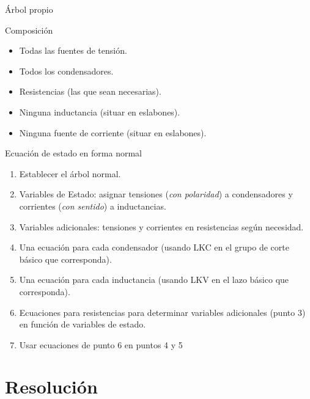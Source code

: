 \documentclass[aspectratio=169, usenames,svgnames,dvipsnames]{beamer}
\begin{document}
\begin{frame}[label={sec:org71f7896}]{Árbol propio}
\begin{block}{Composición}
\begin{itemize}
\item Todas las fuentes de tensión.
\item Todos los condensadores.
\item Resistencias (las que sean necesarias).
\item Ninguna inductancia (situar en eslabones).
\item Ninguna fuente de corriente (situar en eslabones).
\end{itemize}
\end{block}
\end{frame}

\begin{frame}[label={sec:org8fdf487}]{Ecuación de estado en forma normal}
\begin{enumerate}
\item Establecer el \alert{árbol normal}.\pause
\item \alert{Variables de Estado}: asignar tensiones (\emph{con polaridad}) a condensadores y corrientes (\emph{con sentido}) a inductancias.\pause
\item \alert{Variables adicionales}: tensiones y corrientes en resistencias según necesidad.\pause
\item Una \alert{ecuación para cada condensador} (usando LKC en el grupo de corte básico que corresponda).\pause
\item Una \alert{ecuación para cada inductancia} (usando LKV en el lazo básico que corresponda).\pause
\item \alert{Ecuaciones para resistencias} para determinar variables adicionales (punto 3) en función de variables de estado.\pause

\item Usar ecuaciones de punto 6 en puntos 4 y 5
\end{enumerate}
\end{frame}

\section{Resolución}
\label{sec:orge6cbc17}
\end{document}
